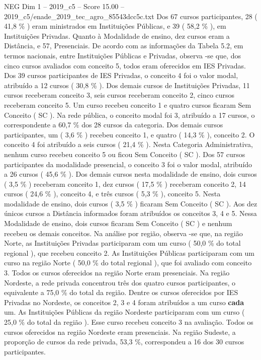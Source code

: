 \begin{textsample}{NEG Dim 1 – 2019\_c5 – Score 15.00 – 2019\_c5/enade\_2019\_tec\_agro\_85543dcc5c.txt}
Dos 67 cursos participantes, 28 ( 41,8 \% ) eram ministrados em Instituições Públicas, e 39 ( 58,2 \% ), em Instituições Privadas.
Quanto à Modalidade de ensino, dez cursos eram a Distância, e 57, Presenciais.
De acordo com as informações da Tabela 5.2, em termos nacionais, entre Instituições Públicas e Privadas, observa -se que, dos cinco cursos avaliados com conceito 5, todos eram oferecidos em IES Privadas.
Dos 39 cursos participantes de IES Privadas, o conceito 4 foi o valor modal, atribuído a 12 cursos ( 30,8 \% ).
Dos demais cursos de Instituições Privadas, 11 cursos receberam conceito 3, seis cursos receberam conceito 2, cinco cursos receberam conceito 5.
Um curso recebeu conceito 1 e quatro cursos ficaram Sem Conceito ( SC ).
Na rede pública, o conceito modal foi 3, atribuído a 17 cursos, o correspondente a 60,7 \% dos 28 cursos da categoria.
Dos demais cursos participantes, um ( 3,6 \% ) recebeu conceito 1, e quatro ( 14,3 \% ), conceito 2.
O conceito 4 foi atribuído a seis cursos ( 21,4 \% ).
Nesta Categoria Administrativa, nenhum curso recebeu conceito 5 ou ficou Sem Conceito ( SC ).
Dos 57 cursos participantes da modalidade presencial, o conceito 3 foi o valor modal, atribuído a 26 cursos ( 45,6 \% ).
Dos demais cursos nesta modalidade de ensino, dois cursos ( 3,5 \% ) receberam conceito 1, dez cursos ( 17,5 \% ) receberam conceito 2, 14 cursos ( 24,6 \% ), conceito 4, e três cursos ( 5,3 \% ), conceito 5.
Nesta modalidade de ensino, dois cursos ( 3,5 \% ) ficaram Sem Conceito ( SC ).
Aos dez únicos cursos a Distância informados foram atribuídos os conceitos 3, 4 e 5.
Nessa Modalidade de ensino, dois cursos ficaram Sem Conceito ( SC ) e nenhum recebeu os demais conceitos.
Na análise por região, observa -se que, na região Norte, as Instituições Privadas participaram com um curso ( 50,0 \% do total regional ), que recebeu conceito 2.
As Instituições Públicas participaram com um curso na região Norte ( 50,0 \% do total regional ), que foi avaliado com conceito 3.
Todos os cursos oferecidos na região Norte eram presenciais.
Na região Nordeste, a rede privada concentrou três dos quatro cursos participantes, o equivalente a 75,0 \% do total da região.
Dentre os cursos oferecidos por IES Privadas no Nordeste, os conceitos 2, 3 e 4 foram atribuídos a um curso \textbf{cada} um.
As Instituições Públicas da região Nordeste participaram com um curso ( 25,0 \% do total da região ).
Esse curso recebeu conceito 3 na avaliação.
Todos os cursos oferecidos na região Nordeste eram presenciais.
Na região Sudeste, a proporção de cursos da rede privada, 53,3 \%, correspondeu a 16 dos 30 cursos participantes.

\end{textsample}
